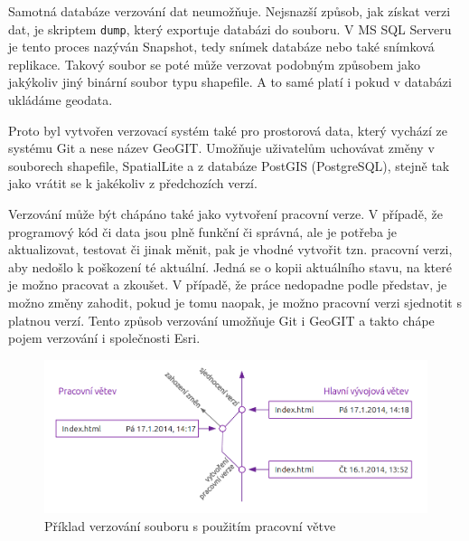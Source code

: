 Samotná databáze verzování dat neumožňuje. Nejsnazší způsob, jak získat verzi dat, je skriptem \texttt{dump}, který exportuje databázi do souboru. V MS SQL Serveru je tento proces nazýván Snapshot, tedy snímek databáze nebo také snímková replikace. Takový soubor se poté může verzovat podobným způsobem jako jakýkoliv jiný binární soubor typu shapefile. A to samé platí i pokud v databázi ukládáme geodata. 

Proto byl vytvořen verzovací systém také pro prostorová data, který vychází ze systému Git a nese název GeoGIT. Umožňuje uživatelům uchovávat změny v souborech shapefile, SpatialLite a z databáze PostGIS (PostgreSQL), stejně tak jako vrátit se k jakékoliv z předchozích verzí. 

Verzování může být chápáno také jako vytvoření pracovní verze. V případě, že programový kód či data jsou plně funkční či správná, ale je potřeba je aktualizovat, testovat či jinak měnit, pak je vhodné vytvořit tzn. pracovní verzi, aby nedošlo k poškození té aktuální. Jedná se o kopii aktuálního stavu, na které je možno pracovat a zkoušet. V případě, že práce nedopadne podle představ, je možno změny zahodit, pokud je tomu naopak, je možno pracovní verzi sjednotit s platnou verzí. Tento způsob verzování umožňuje Git i GeoGIT a takto chápe pojem verzování i společnosti Esri.

          \begin{figure}[H]
            \centering
            \includegraphics[scale=1]{../../../grafy/obr/schema_verzovaniBranch.png}
            \caption {Příklad verzování souboru s použitím pracovní větve}
          \end{figure}

        

